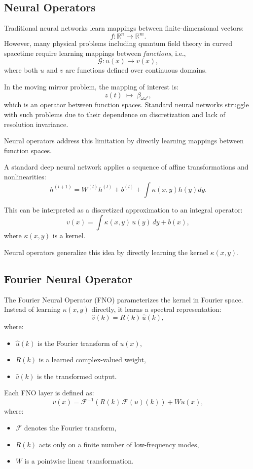 \subsection{Neural Operators}

Traditional neural networks learn mappings between finite-dimensional vectors:
\[
f: \mathbb{R}^n \rightarrow \mathbb{R}^m.
\]
However, many physical problems including quantum field theory in curved spacetime require learning mappings between \emph{functions}, i.e.,
\[
\mathcal{G}: u(x) \rightarrow v(x),
\]
where both $u$ and $v$ are functions defined over continuous domains.

In the moving mirror problem, the mapping of interest is:
\[
z(t) \;\longmapsto\; \beta_{\omega \omega'},
\]
which is an operator between function spaces. Standard neural networks struggle with such problems due to their dependence on discretization and lack of resolution invariance.

Neural operators address this limitation by directly learning mappings between function spaces.

A standard deep neural network applies a sequence of affine transformations and nonlinearities:
\[
h^{(l+1)} = W^{(l)} h^{(l)} + b^{(l)}+\int\kappa(x,y)h(y)dy.
\]

This can be interpreted as a discretized approximation to an integral operator:
\[
v(x) = \int \kappa(x, y)\, u(y)\, dy + b(x),
\]
where $\kappa(x,y)$ is a kernel.

Neural operators generalize this idea by directly learning the kernel $\kappa(x,y)$.

\subsection{Fourier Neural Operator}

The Fourier Neural Operator (FNO) parameterizes the kernel in Fourier space. Instead of learning $\kappa(x,y)$ directly, it learns a spectral representation:
\[
\hat{v}(k) = R(k)\, \hat{u}(k),
\]
where:
\begin{itemize}
    \item $\hat{u}(k)$ is the Fourier transform of $u(x)$,
    \item $R(k)$ is a learned complex-valued weight,
    \item $\hat{v}(k)$ is the transformed output.
\end{itemize}

Each FNO layer is defined as:
\begin{equation}
v(x) = \mathcal{F}^{-1}\left( R(k)\,\mathcal{F}(u)(k) \right) + W u(x),
\end{equation}
where:
\begin{itemize}
    \item $\mathcal{F}$ denotes the Fourier transform,
    \item $R(k)$ acts only on a finite number of low-frequency modes,
    \item $W$ is a pointwise linear transformation.
\end{itemize}

